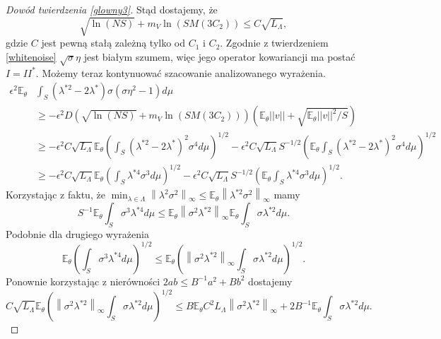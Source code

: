\documentclass[man,mfiu]{mgrwms}
\newcommand{\norm}[1]{\left\lVert#1\right\rVert}
\begin{document}
\begin{proof}[Dowód twierdzenia \ref{glowny3}]
Stąd dostajemy, że 
\begin{displaymath}
\sqrt{\ln (NS)}+m_V\ln (SM(3C_2))\leq C\sqrt{L_{\Lambda}},
\end{displaymath}
gdzie $C$ jest pewną stałą zależną tylko od $C_1$ i $C_2$. Zgodnie z twierdzeniem \ref{whitenoise} $\sqrt{\sigma}\eta$ jest białym szumem, więc jego operator kowariancji ma postać $I=II^*$. Możemy teraz kontynuować szacowanie analizowanego wyrażenia.
\begin{displaymath}
\begin{split}
\epsilon^2\mathbb{E}_{\theta}&\int_S(\lambda^{*2}-2\lambda^*)\sigma(\sigma\eta^2-1)d\mu\\
&\geq  -\epsilon^2D\left(\sqrt{\ln (NS)}+m_V\ln (SM(3C_2))\right)\left(\mathbb{E}_{\theta}||v||+\sqrt{\mathbb{E}_{\theta}||v||^2/S}\right)\\
&\geq -\epsilon^2C\sqrt{L_{\Lambda}}\mathbb{E}_{\theta}\left(\int_S(\lambda^{*2}-2\lambda^*)^2\sigma^4d\mu\right)^{1/2}
-\epsilon^2C\sqrt{L_{\Lambda}}S^{-1/2}\left(\mathbb{E}_{\theta}\int_S(\lambda^{*2}-2\lambda^*)^2\sigma^4 d\mu\right)^{1/2}\\
&\geq -\epsilon^2C\sqrt{L_{\Lambda}}\mathbb{E}_{\theta}\left(\int_S\lambda^{*4}\sigma^3d\mu\right)^{1/2}-\epsilon^2C\sqrt{L_{\Lambda}}S^{-1/2}\left(\mathbb{E}_{\theta}\int_S\lambda^{*4}\sigma^3d\mu\right)^{1/2}.
\end{split}
\end{displaymath}
Korzystając z faktu, że $\min_{\lambda\in \Lambda}\norm{\lambda^2\sigma^2}_{\infty}\leq \mathbb{E}_{\theta}\norm{\lambda^{*2}\sigma^2}_{\infty}$ mamy
\begin{displaymath}
S^{-1}\mathbb{E}_{\theta}\int_S\sigma^3\lambda^{*4}d\mu\leq 
 \mathbb{E}_{\theta}\norm{\sigma^2\lambda^{*2}}_{\infty}\mathbb{E}_{\theta}\int_S\sigma\lambda^{*2}d\mu.
\end{displaymath}
Podobnie dla drugiego wyrażenia
\begin{displaymath}
\mathbb{E}_{\theta}\left(\int_S\sigma^3\lambda^{*4}d\mu\right)^{1/2}\leq \mathbb{E}_{\theta}\left(\norm{\sigma^2\lambda^{*2}}_{\infty}\int_S\sigma\lambda^{*2}d\mu\right)^{1/2}.
\end{displaymath}
Ponownie korzystając z nierówności $2ab\leq B^{-1}a^2+Bb^2$ dostajemy
\begin{displaymath}
C\sqrt{L_{\Lambda}}\mathbb{E}_{\theta}\left(\norm{\sigma^2\lambda^{*2}}_{\infty}\int_S\sigma\lambda^{*2}d\mu\right)^{1/2}
\leq B\mathbb{E}_{\theta}C^2L_{\Lambda}\norm{\sigma^2\lambda^{*2}}_{\infty}+2B^{-1}\mathbb{E}_{\theta}\int_S\sigma\lambda^{*2}d\mu.

\end{displaymath}
\end{proof}
\end{document}
